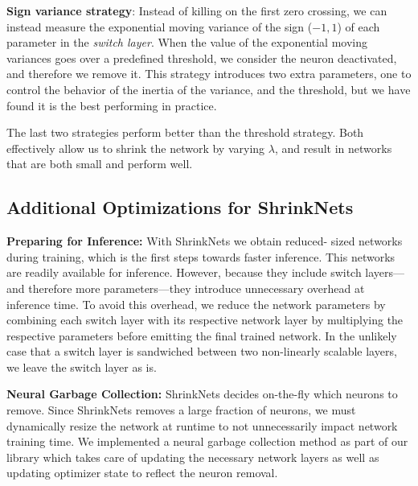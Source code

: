 \textbf{Sign variance strategy}: Instead of killing  on the first zero
crossing, we can instead measure the exponential moving variance of the sign
($-1, 1$) of each parameter in the \textit{switch layer}. When the value of
the exponential moving variances goes over a predefined threshold, we consider
the neuron deactivated, and therefore we remove it. This strategy introduces
two extra parameters, one to control the behavior of the inertia of the
variance, and the threshold, but we have found it is the best performing in
practice.

The last two strategies perform better than the threshold strategy.  Both
effectively allow us to shrink the network by varying $\lambda$, and result in
networks that are both small and perform well.


\subsection{Additional Optimizations for ShrinkNets}

\noindent\textbf{Preparing for Inference: } With ShrinkNets we obtain reduced-
sized networks during training, which is the first steps towards faster
inference. This networks are readily available for inference. However, because
they include switch layers---and therefore more parameters---they introduce
unnecessary overhead at inference time. To avoid this overhead, we reduce the
network parameters by combining each switch layer with its respective network
layer by multiplying the respective parameters before emitting the final
trained network.   In the unlikely case that a switch layer is sandwiched
between two non-linearly scalable layers, we leave the switch layer as is.

\noindent\textbf{Neural Garbage Collection: }ShrinkNets decides on-the-fly
which neurons to remove. Since ShrinkNets removes a large fraction of neurons,
we must dynamically resize the network at runtime to not unnecessarily impact
network training time. We implemented a neural garbage collection method as
part of our library which takes care of updating the necessary network layers
as well as updating optimizer state to reflect the neuron removal.


